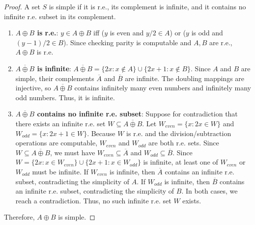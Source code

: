 \documentclass{article}
\begin{document}
\begin{proof}
A set $S$ is simple if it is r.e., its complement is infinite, and it contains no infinite r.e. subset in its complement.
\begin{enumerate}
    \item \textbf{$A \oplus B$ is r.e.}: 
    $y \in A \oplus B$ iff ($y$ is even and $y/2 \in A$) or ($y$ is odd and $(y-1)/2 \in B$). Since checking parity is computable and $A, B$ are r.e., $A \oplus B$ is r.e.
    
    \item \textbf{$\overline{A \oplus B}$ is infinite}: 
    $\overline{A \oplus B} = \{2x : x \notin A\} \cup \{2x + 1 : x \notin B\}$. Since $A$ and $B$ are simple, their complements $\overline{A}$ and $\overline{B}$ are infinite. The doubling mappings are injective, so $\overline{A \oplus B}$ contains infinitely many even numbers and infinitely many odd numbers. Thus, it is infinite.
    
    \item \textbf{$\overline{A \oplus B}$ contains no infinite r.e. subset}:
    Suppose for contradiction that there exists an infinite r.e. set $W \subseteq \overline{A \oplus B}$.
    Let $W_{even} = \{ x : 2x \in W \}$ and $W_{odd} = \{ x : 2x + 1 \in W \}$. 
    Because $W$ is r.e. and the division/subtraction operations are computable, $W_{even}$ and $W_{odd}$ are both r.e. sets.
    Since $W \subseteq \overline{A \oplus B}$, we must have $W_{even} \subseteq \overline{A}$ and $W_{odd} \subseteq \overline{B}$.
    Since $W = \{2x : x \in W_{even}\} \cup \{2x+1 : x \in W_{odd}\}$ is infinite, at least one of $W_{even}$ or $W_{odd}$ must be infinite.
    If $W_{even}$ is infinite, then $\overline{A}$ contains an infinite r.e. subset, contradicting the simplicity of $A$.
    If $W_{odd}$ is infinite, then $\overline{B}$ contains an infinite r.e. subset, contradicting the simplicity of $B$.
    In both cases, we reach a contradiction. 
    Thus, no such infinite r.e. set $W$ exists.
\end{enumerate}
Therefore, $A \oplus B$ is simple.
\end{proof}
\end{document}
